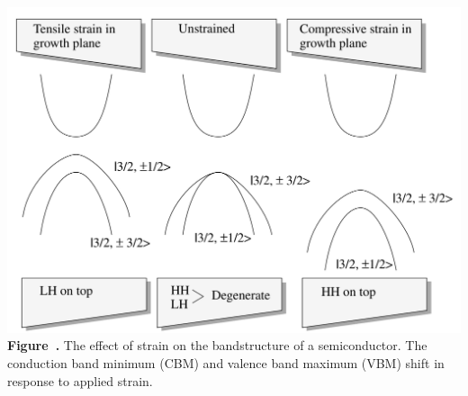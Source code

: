 \begin{center}
	\begin{minipage}{0.7\textwidth}
		\centering
		\includegraphics[width=\textwidth]{img/strain_effect.png}
		\\[0.5em]
		\textbf{Figure~\thefigure.} The effect of strain on the bandstructure of a semiconductor. The conduction band minimum (CBM) and valence band maximum (VBM) shift in response to applied strain. \\
		\label{fig:strain_effect}
	\end{minipage}
\end{center}

